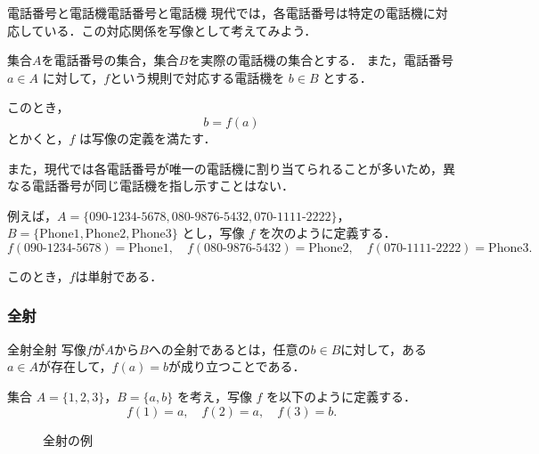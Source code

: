 \documentclass[a4paper,11pt]{ltjsarticle}
\begin{document}
\begin{example}{電話番号と電話機}{電話番号と電話機}
  現代では，各電話番号は特定の電話機に対応している．この対応関係を写像として考えてみよう．

  集合$A$を電話番号の集合，集合$B$を実際の電話機の集合とする．
  また，電話番号 $a \in A$ に対して，$f$という規則で対応する電話機を $b \in B$ とする．

  このとき，
  \[
    b = f(a)
  \]
  とかくと，$f$ は写像の定義を満たす．

  また，現代では各電話番号が唯一の電話機に割り当てられることが多いため，異なる電話番号が同じ電話機を指し示すことはない．

  例えば，$A = \{\text{090-1234-5678}, \text{080-9876-5432}, \text{070-1111-2222}\}$，
  $B = \{\text{Phone1}, \text{Phone2}, \text{Phone3}\}$ とし，写像 $f$ を次のように定義する．
  \[
    f(\text{090-1234-5678}) = \text{Phone1}, \quad
    f(\text{080-9876-5432}) = \text{Phone2}, \quad
    f(\text{070-1111-2222}) = \text{Phone3}.
  \]

  このとき，$f$は単射である．
\end{example}

\subsubsection{全射}

\begin{definition}{全射}{全射}
  写像$f$が$A$から$B$への全射であるとは，任意の$b \in B$に対して，ある$a \in A$が存在して，$f(a) = b$が成り立つことである．
\end{definition}

集合 $A = \{1, 2, 3\}$，$B = \{a, b\}$ を考え，写像 $f$ を以下のように定義する．
\[
  f(1) = a, \quad f(2) = a, \quad f(3) = b.
\]

\begin{figure}[h]
  \centering
  \caption{全射の例}
\end{figure}
\end{document}
